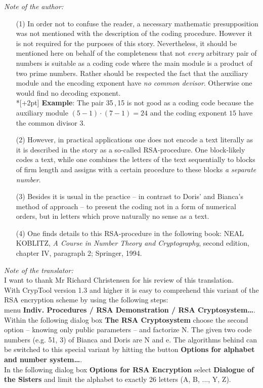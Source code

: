 \noindent
{\em Note of the author:\/}
\begin{itemize}
\item[(1)] In order not to confuse the reader, a necessary mathematic
  presupposition was not mentioned with the description of the coding
  procedure.  However it is not required for the purposes of this story.
  Nevertheless, it should be mentioned here on behalf of the completeness
  that not {\em every\/} arbitrary pair of numbers is suitable as a coding
  code where the main module is a product of two prime numbers.  Rather
  should be respected the fact that the auxiliary module and the encoding
  exponent have {\em no common devisor\/}.
  Otherwise one would find no decoding exponent. \\*[+2pt]
  {\bf Example}: The pair 35\,,\,15 is not good as a coding code
  because the auxiliary module \((5-1) \cdot (7-1) =24\) and the coding
  exponent \(15\) have the common divisor \(3\).
\item[(2)] However, in practical applications one does not encode a text literally
as it is described in the story as a so-called RSA-procedure.  One
block-likely codes a text, while one combines the letters of the text
sequentially to blocks of firm length and assigns with a certain procedure
to these blocks {\em a separate number\/}.

\item[(3)] Besides it is usual in the practice -- in contrast to Doris' and
Bianca's method of approach -- to present the coding not in a form of
numerical orders, but in letters which prove naturally no sense as a text.

\item[(4)] One finds details to this RSA-procedure in the following book: {\small
  NEAL KOBLITZ}, {\em A Course in Number Theory and Cryptography\/},
second edition, chapter IV, paragraph 2; Springer, 1994. \\
\end{itemize}
\[\]
\hrulefill
\[\]
\[\]
{\em Note of the translator:} \\
I want to thank Mr Richard Christensen for his review of this translation.
\\[1ex]
With CrypTool version 1.3 and higher it is easy to comprehend this variant of the RSA encryption scheme by using 
the following steps: \\
menu {\bf Indiv. Procedures / RSA Demonstration / RSA Cryptosystem\dots}. \\
Within the following dialog box {\bf The RSA Cryptosystem} choose the second option -- knowing only public parameters -- and factorize N. The given 
two code numbers (e.g. 51, 3) of Bianca and Doris are N and e. The algorithms behind can be switched to this 
special variant by hitting the button \textbf{Options for alphabet and number system\dots}. \\
In the following dialog 
box {\bf Options for RSA Encryption} select \textbf{Dialogue of the Sisters} and limit the alphabet to exactly 26 
letters (A, B, ..., Y, Z).




